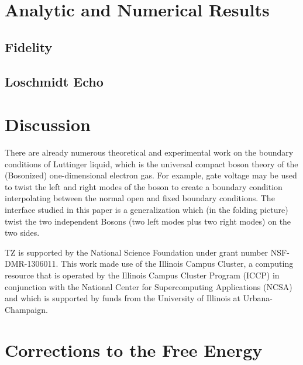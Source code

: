 \documentclass[preprint, prb]{revtex4-1}
\begin{document}
\section{Analytic and Numerical Results}
\subsection{Fidelity}
\subsection{Loschmidt Echo}

\section{Discussion}

There are already numerous theoretical and experimental work on the boundary conditions of Luttinger liquid\cite{schmeltzer_zero_1999,anfuso_luttinger_2003,voit_bounded_2000,fabrizio_interacting_1995,egger_applying_1998}, which is the universal compact boson theory of the (Bosonized) one-dimensional electron gas\cite{giamarchi_quantum_2015}. For example, gate voltage \cite{egger_applying_1998} may be used to twist the left and right modes of the boson to create a boundary condition interpolating between the normal open and fixed boundary conditions. The interface studied in this paper is a generalization which (in the folding picture) twist the two independent Bosons (two left modes plus two right modes) on the two sides. 

\begin{acknowledgments}
    TZ is supported by the National Science Foundation under grant number NSF-DMR-1306011.
    This work made use of the Illinois Campus Cluster, a computing resource that is operated by the
    Illinois Campus Cluster Program (ICCP) in conjunction with the National Center for
    Supercomputing Applications (NCSA) and which is supported by funds from the University of
    Illinois at Urbana-Champaign.
\end{acknowledgments}

\appendix
\section{Corrections to the Free Energy}
\end{document}
